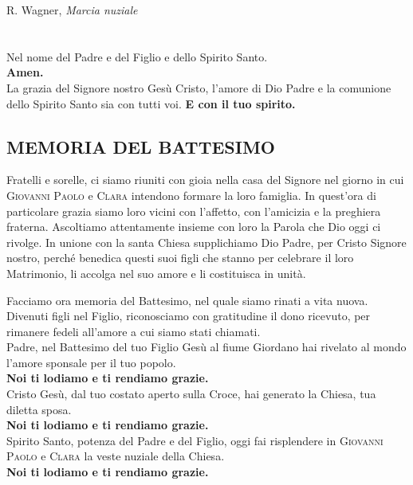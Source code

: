 \documentclass[10pt,b6paper,usenames,twoside]{article}
\begin{document}
\vspace*{-0cm}

\clearpage


\setcounter{page}{1}

\noindent \textcolor{forestgreen(traditional)}{\Acht} \hspace*{0mm} R. Wagner, \textit{Marcia nuziale}

\section*{\textcolor{forestgreen(traditional)}{}} 
\noindent Nel nome del Padre e del Figlio e dello Spirito Santo.\\ \textbf{Amen.} 
\\ 
La grazia del Signore nostro Gesù Cristo, l'amore di Dio Padre e la comunione dello Spirito Santo sia con tutti voi. \textbf{E con il tuo spirito.} 

\subsection*{\textcolor{forestgreen(traditional)}{MEMORIA DEL BATTESIMO}} 
\noindent Fratelli e sorelle, ci siamo riuniti con gioia nella casa del Signore nel giorno in cui \textcolor{forestgreen(traditional)}{\textsc{Giovanni Paolo}} e \textcolor{forestgreen(traditional)}{\textsc{Clara}} intendono formare la loro famiglia. In quest'ora di particolare grazia siamo loro vicini con l'affetto, con l’amicizia e la preghiera fraterna. Ascoltiamo attentamente insieme con loro la Parola che Dio oggi ci rivolge. In unione con la santa Chiesa supplichiamo Dio Padre, per Cristo Signore nostro, perché benedica questi suoi figli che stanno per celebrare il loro Matrimonio, li accolga nel suo amore e li costituisca in unità.

\noindent Facciamo ora memoria del Battesimo, nel quale siamo rinati a vita nuova.
Divenuti figli nel Figlio, riconosciamo con gratitudine il dono ricevuto, per rimanere fedeli all'amore a cui siamo stati chiamati.\\
 
\noindent Padre, nel Battesimo del tuo Figlio Gesù al fiume Giordano hai rivelato al mondo l'amore sponsale per il tuo popolo.\\ 
\textbf{Noi ti lodiamo e ti rendiamo grazie.}\smallskip 
\\ 
Cristo Gesù, dal tuo costato aperto sulla Croce, hai generato la Chiesa, tua diletta sposa.\\ 
\textbf{Noi ti lodiamo e ti rendiamo grazie.}\smallskip 
\\ 
Spirito Santo, potenza del Padre e del Figlio, oggi fai risplendere in \textcolor{forestgreen(traditional)}{\textsc{Giovanni Paolo}} e \textcolor{forestgreen(traditional)}{\textsc{Clara}} la veste nuziale della Chiesa.\\ 
\textbf{Noi ti lodiamo e ti rendiamo grazie.}\\
\end{document}
